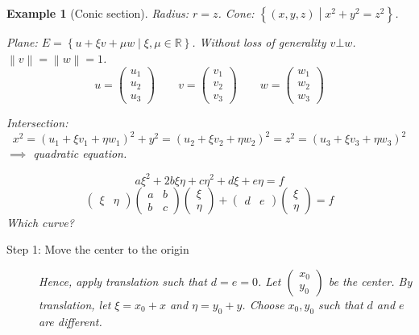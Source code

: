 \documentclass[a4paper]{article}
\newcounter{lecref}[section]
\numberwithin{lecref}{section}
\newtheorem{example}[lecref]{Example}
\newcommand{\set}[1]{\left\{#1\right\}}
\newcommand{\norm}[1]{\left\|#1\right\|}
\begin{document}
\begin{example}[Conic section] %
  Radius: $r = z$. Cone: $\set{(x, y, z) \middle| x^2 + y^2 = z^2}$.

  Plane: $E = \set{u + \xi v + \mu w \middle| \xi, \mu \in \mathbb R}$.
  Without loss of generality $v \bot w$. $\norm v = \norm w = 1$.
  \[ u = \begin{pmatrix} u_1 \\ u_2 \\ u_3 \end{pmatrix} \qquad v = \begin{pmatrix} v_1 \\ v_2 \\ v_3 \end{pmatrix} \qquad w = \begin{pmatrix} w_1 \\ w_2 \\ w_3 \end{pmatrix} \]

  Intersection:
  \[ x^2 = (u_1 + \xi v_1 + \eta w_1)^2 + y^2 = (u_2 + \xi v_2 + \eta w_2)^2 = z^2 = (u_3 + \xi v_3 + \eta w_3)^2 \]
  $\implies$ quadratic equation.

  \[ a \xi^2 + 2b \xi \eta + c\eta^2 + d\xi + e\eta = f \]
  \[
    \begin{pmatrix} \xi & \eta \end{pmatrix}
    \begin{pmatrix} a & b \\ b & c \end{pmatrix}
    \begin{pmatrix} \xi \\ \eta \end{pmatrix}
    + \begin{pmatrix} d & e \end{pmatrix}
    \begin{pmatrix} \xi \\ \eta \end{pmatrix}
    = f
  \]
  Which curve?

  \begin{description}
    \item[Step 1: Move the center to the origin] 
      Hence, apply translation such that $d = e = 0$.
      Let $\begin{pmatrix} x_0 \\ y_0 \end{pmatrix}$ be the center.
      By translation, let $\xi = x_0 + x$ and $\eta = y_0 + y$.
      Choose $x_0, y_0$ such that $d$ and $e$ are different.


\end{description}
\end{example}
\end{document}

